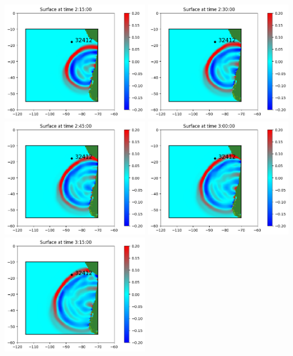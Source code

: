 \documentclass[11pt]{article}
\begin{document}
\vskip 10pt 
\includegraphics[width=0.475\textwidth]{fgout0001frame0010fig0.png}
\vskip 10pt 
\includegraphics[width=0.475\textwidth]{fgout0001frame0011fig0.png}
\vskip 10pt 
\includegraphics[width=0.475\textwidth]{fgout0001frame0012fig0.png}
\vskip 10pt 
\includegraphics[width=0.475\textwidth]{fgout0001frame0013fig0.png}
\vskip 10pt 
\includegraphics[width=0.475\textwidth]{fgout0001frame0014fig0.png}
\end{document}
